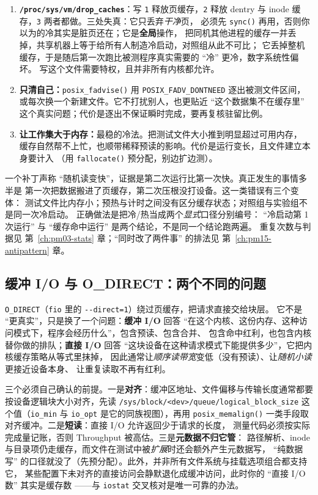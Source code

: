\documentclass[12pt,a4paper,fontset=fandol]{ctexbook}
\newcommand{\Fn}[1]{\texttt{#1()}}
\newcommand{\Tp}[1]{\texttt{#1}}
\newcommand{\Opt}[1]{\texttt{-\/-#1}}
\newcommand{\Bk}{\discretionary{}{}{}}
\newcommand{\Lang}[1]{\textsf{#1}}
\newcommand{\MThr}{\Lang{Throughput}}
\begin{document}
\begin{enumerate}
\item \textbf{\Tp{/proc/sys/vm/drop\_caches}}：写 \Tp{1} 释放页缓存，\Tp{2} 释放
  dentry 与 inode 缓存，\Tp{3} 两者都做。三处失真：它只丢弃\emph{干净}页，
  必须先 \Fn{sync} 再用，否则你以为的冷其实是脏页还在；它是\textbf{全局}操作，
  把同机其他进程的缓存一并丢掉，共享机器上等于给所有人制造冷启动，对照组从此不可比；
  它丢掉整机缓存，于是随后第一次跑比被测程序真实需要的 ``冷'' 更冷，数字系统性偏坏。
  写这个文件需要特权，且并非所有内核都允许。
\item \textbf{只清自己：}\Fn{posix\_fadvise} 用 \Tp{POSIX\_FADV\_DONTNEED}
  逐出被测文件区间，或每次换一个新建文件。它不打扰别人，也更贴近
  ``这个数据集不在缓存里'' 这个真实问题；代价是逐出不保证瞬时完成，要再复核驻留比例。
\item \textbf{让工作集大于内存：}最稳的冷法。把测试文件大小推到明显超过可用内存，
  缓存自然帮不上忙，也顺带稀释预读的影响。代价是运行变长，且文件建立本身要计入
  （用 \Fn{fallocate} 预分配，别边扩边测）。
\end{enumerate}

\begin{warning}[title={``第二次跑当然快''：最常见的 I/O 假结论}]
一个补丁声称 ``随机读变快''，证据是第二次运行比第一次快。真正发生的事情多半是
第一次把数据搬进了页缓存，第二次压根没打设备。这一类错误有三个变体：
测试文件比内存小；预热与计时之间没有区分缓存状态；对照组与实验组不是同一次冷启动。
正确做法是把冷/热当成两个\emph{显式}口径分别编号：
``冷启动第 1 次运行'' 与 ``缓存命中运行'' 是两个结论，不是同一个结论跑两遍。
重复次数与判据见 第~\ref{ch:pm03-stats} 章；``同时改了两件事'' 的排法见
第~\ref{ch:pm15-antipattern} 章。
\end{warning}

\subsection{缓冲 I/O 与 O\_DIRECT：两个不同的问题}
\label{sub:pm08-odirect}

\Tp{O\_DIRECT}（\Tp{fio} 里的 \Opt{direct=1}）绕过页缓存，把请求直接交给块层。
它不是 ``更真实''，只是换了一个问题：\textbf{缓冲 I/O} 回答
``在这个内核、这份内存、这种访问模式下，程序会经历什么''，包含预读、包含合并、
包含命中红利，也包含内核替你做的排队；\textbf{直接 I/O} 回答
``这块设备在这种请求模式下能提供多少''，它把内核缓存策略从等式里抹掉，
因此通常让\emph{顺序读带宽}变低（没有预读）、让\emph{随机小读}更接近设备本身、
让重复读取不再有红利。

三个必须自己确认的前提。一是\textbf{对齐}：缓冲区地址、文件偏移与传输长度通常都要
按设备逻辑块大小对齐，先读 \Tp{/sys/block/<dev>/queue/logical{\Bk}\_block{\Bk}\_size}
这个值（\Tp{io\_min} 与 \Tp{io\_opt} 是它的同族视图），再用 \Fn{posix\_memalign}
一类手段取对齐缓冲。二是\textbf{短读}：直接 I/O 允许返回少于请求的长度，
测量代码必须按实际完成量记账，否则 \MThr{} 被高估。三是\textbf{元数据不归它管}：
路径解析、inode 与目录项仍走缓存，而文件在测试中被\emph{扩展}时还会额外产生元数据写，
``纯数据写'' 的口径就没了（先预分配）。此外，并非所有文件系统与挂载选项组合都支持它，
某些配置下未对齐的直接访问会静默退化成缓冲访问，此时你的 ``直接 I/O 数'' 其实是缓存数
——与 \Tp{iostat} 交叉核对是唯一可靠的办法。
\end{document}
